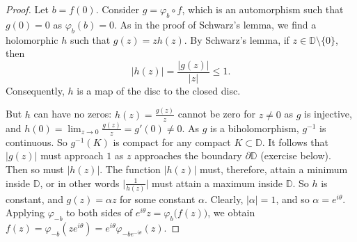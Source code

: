 \documentclass[12pt,openany]{book}
\newcommand{\sabs}[1]{\lvert {#1} \rvert}
\newcommand{\babs}[1]{\bigl\lvert {#1} \bigr\rvert}
\newcommand{\D}{{\mathbb{D}}}
\theoremstyle{plain}
\theoremstyle{remark}
\theoremstyle{definition}
\theoremstyle{exercise}
\theoremstyle{example}
\begin{document}
\begin{proof}
Let $b = f(0)$.
Consider $g = \varphi_b \circ f$, which is an automorphism
such that $g(0) = 0$ as
$\varphi_b(b) = 0$.
As in the proof of Schwarz's lemma, we find a holomorphic $h$
such that $g(z) = z h(z)$.  By
Schwarz's lemma, if $z \in \D \setminus \{ 0 \}$, then
\begin{equation*}
\sabs{h(z)} = \frac{\sabs{g(z)}}{\sabs{z}} \leq 1 .
\end{equation*}
Consequently, $h$ is a map of the disc to the closed disc.

But $h$ can have no zeros:
$h(z) = \frac{g(z)}{z}$ cannot be zero for $z \neq 0$ as $g$ is injective,
and $h(0) = \lim_{z\to 0} \frac{g(z)}{z} = g'(0) \neq 0$.  As $g$ is a biholomorphism, $g^{-1}$ is
continuous. So $g^{-1}(K)$ is compact for any compact $K \subset \D$.
It follows that $\sabs{g(z)}$ must approach $1$ as $z$
approaches the boundary $\partial \D$ (exercise below).
Then so must $\sabs{h(z)}$.
The function
$\sabs{h(z)}$ must, therefore, attain a minimum inside $\D$, or in other
words $\babs{\frac{1}{h(z)}}$ must attain a maximum inside $\D$.
So $h$ is constant, and $g(z) = \alpha z$ for some constant $\alpha$.
Clearly, 
$\sabs{\alpha} = 1$, and so $\alpha = e^{i\theta}$.  Applying
$\varphi_{-b}$ to both sides of $e^{i\theta} z = \varphi_b \bigl( f(z)
\bigr)$,
we obtain
$f(z) = \varphi_{-b}(ze^{i\theta})
= e^{i \theta} \varphi_{-be^{-i\theta}}(z)$.
\end{proof}
\end{document}
